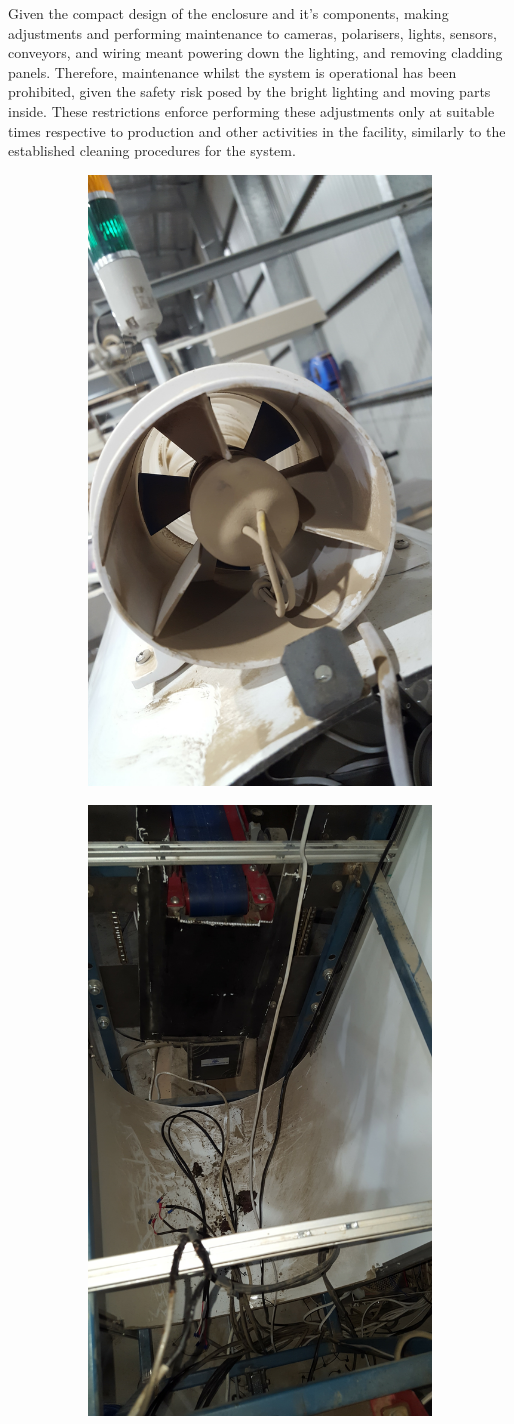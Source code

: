 \documentclass[fleqn,twoside,12pt]{report}
\begin{document}
Given the compact design of the enclosure and it's components, making adjustments and performing maintenance to cameras, polarisers, lights, sensors, conveyors, and wiring meant powering down the lighting, and removing cladding panels. Therefore, maintenance whilst the system is operational has been prohibited, given the safety risk posed by the bright lighting and moving parts inside. These restrictions enforce performing these adjustments only at suitable times respective to production and other activities in the facility, similarly to the established cleaning procedures for the system. 



\begin{figure}[ht]
	\centering
	\begin{subfigure}{.25\textwidth}
		\centering
		\includegraphics[height=0.9\linewidth,angle=270]{dirt_1.jpg}
		\caption{}
		\label{fig:dirt_1}
	\end{subfigure}%
	\begin{subfigure}{.25\textwidth}
		\centering
		\includegraphics[height=0.9\linewidth,angle=270]{dirt_2.jpg}

\end{subfigure}
\end{figure}
\end{document}
